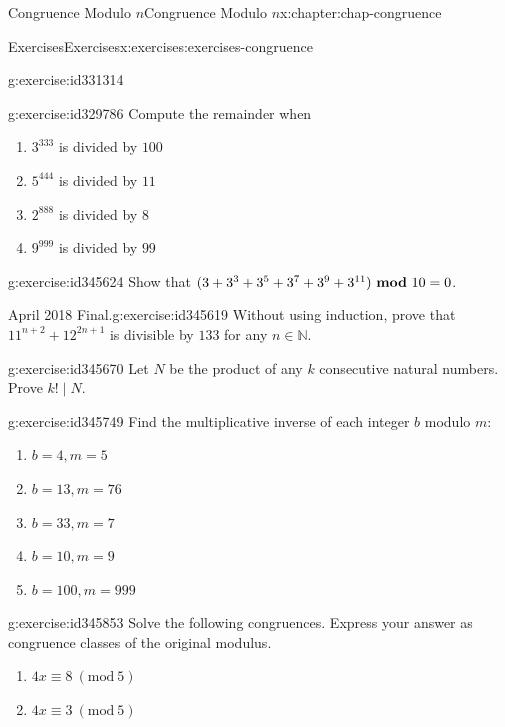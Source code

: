 \documentclass[oneside,10pt,]{book}
\numberwithin{equation}{section}
\newcommand{\Mod}[1]{\ \left(\mathrm{mod}\ #1\right)}
\newcommand{\mmod}[1]{\ \mathrm{\bf mod}\ #1}
\begin{document}
\begin{chapterptx}{Congruence Modulo \(n\)}{}{Congruence Modulo \(n\)}{}{}{x:chapter:chap-congruence}
\begin{exercises-section}{Exercises}{}{Exercises}{}{}{x:exercises:exercises-congruence}
\begin{divisionexercise}{5}{}{}{g:exercise:id331314}
\end{divisionexercise}%
\begin{divisionexercise}{6}{}{}{g:exercise:id329786}%
Compute the remainder when%
\begin{enumerate}[label=(\alph*)]
\item{}\(3^{333}\) is divided by \(100\)%
\item{}\(5^{444}\) is divided by \(11\)%
\item{}\(2^{888}\) is divided by \(8\)%
\item{}\(9^{999}\) is divided by \(99\)%
\end{enumerate}
%
\end{divisionexercise}%
\begin{divisionexercise}{7}{}{}{g:exercise:id345624}%
Show that \((3 + 3^3 + 3^5 + 3^7 + 3^9 + 3^{11}) \mmod{10} = 0\).%
\end{divisionexercise}%
\begin{divisionexercise}{8}{April 2018 Final.}{}{g:exercise:id345619}%
Without using induction, prove that \(11^{n+2} + 12^{2n+1}\) is divisible by \(133\) for any \(n \in \mathbb{N}\).%
\end{divisionexercise}%
\begin{divisionexercise}{9}{}{}{g:exercise:id345670}%
Let \(N\) be the product of any \(k\) consecutive natural numbers. Prove \(k! \mid N\).%
\end{divisionexercise}%
\begin{divisionexercise}{10}{}{}{g:exercise:id345749}%
Find the multiplicative inverse of each integer \(b\) modulo \(m\):%
\begin{enumerate}[label=(\alph*)]
\item{}\(\displaystyle b = 4, m = 5\)%
\item{}\(\displaystyle b = 13, m = 76\)%
\item{}\(\displaystyle b = 33, m = 7\)%
\item{}\(\displaystyle b = 10, m = 9\)%
\item{}\(\displaystyle b = 100, m = 999\)%
\end{enumerate}
%
\end{divisionexercise}%
\begin{divisionexercise}{11}{}{}{g:exercise:id345853}%
Solve the following congruences. Express your answer as congruence classes of the original modulus.%
\begin{enumerate}[label=(\alph*)]
\item{}\(\displaystyle 4x \equiv 8 \Mod{5}\)%
\item{}\(\displaystyle 4x \equiv 3 \Mod{5}\)%

\end{enumerate}
\end{divisionexercise}
\end{exercises-section}
\end{chapterptx}
\end{document}
